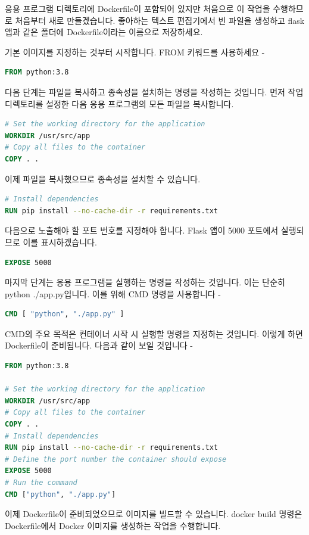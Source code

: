 응용 프로그램 디렉토리에 Dockerfile이 포함되어 있지만 처음으로 이 작업을 수행하므로 처음부터 새로 만들겠습니다. 좋아하는 텍스트 편집기에서 빈 파일을 생성하고 flask 앱과 같은 폴더에 Dockerfile이라는 이름으로 저장하세요.

기본 이미지를 지정하는 것부터 시작합니다. FROM 키워드를 사용하세요 -
\begin{lstlisting}[language=dockerfile]
FROM python:3.8
\end{lstlisting}

다음 단계는 파일을 복사하고 종속성을 설치하는 명령을 작성하는 것입니다. 먼저 작업 디렉토리를 설정한 다음 응용 프로그램의 모든 파일을 복사합니다.
\begin{lstlisting}[language=dockerfile]
# Set the working directory for the application
WORKDIR /usr/src/app
# Copy all files to the container
COPY . .
\end{lstlisting}

이제 파일을 복사했으므로 종속성을 설치할 수 있습니다.
\begin{lstlisting}[language=dockerfile]
# Install dependencies
RUN pip install --no-cache-dir -r requirements.txt
\end{lstlisting}

다음으로 노출해야 할 포트 번호를 지정해야 합니다. Flask 앱이 5000 포트에서 실행되므로 이를 표시하겠습니다.
\begin{lstlisting}[language=dockerfile]
EXPOSE 5000
\end{lstlisting}

마지막 단계는 응용 프로그램을 실행하는 명령을 작성하는 것입니다. 이는 단순히 python ./app.py입니다. 이를 위해 CMD 명령을 사용합니다 -
\begin{lstlisting}[language=dockerfile]
CMD [ "python", "./app.py" ]
\end{lstlisting}

CMD의 주요 목적은 컨테이너 시작 시 실행할 명령을 지정하는 것입니다. 이렇게 하면 Dockerfile이 준비됩니다. 다음과 같이 보일 것입니다 -
\begin{lstlisting}[language=dockerfile]
FROM python:3.8

# Set the working directory for the application
WORKDIR /usr/src/app
# Copy all files to the container
COPY . .
# Install dependencies
RUN pip install --no-cache-dir -r requirements.txt
# Define the port number the container should expose
EXPOSE 5000
# Run the command
CMD ["python", "./app.py"]
\end{lstlisting}

이제 Dockerfile이 준비되었으므로 이미지를 빌드할 수 있습니다. docker build 명령은 Dockerfile에서 Docker 이미지를 생성하는 작업을 수행합니다.

